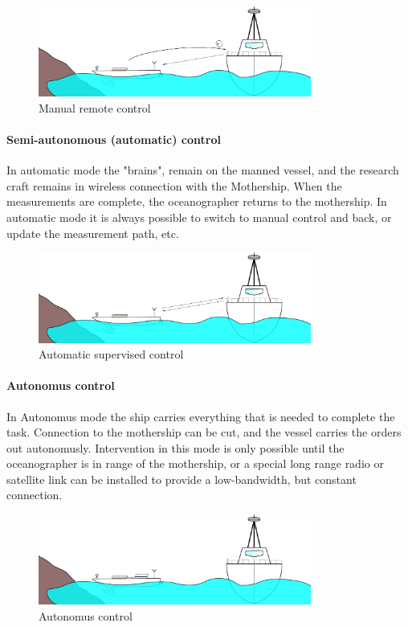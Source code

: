 \begin{figure}[H]
	\centering
	\includegraphics[width=0.8\textwidth]{img/manualcontrol}
	\caption{Manual remote control}
	\label{fig:manualcontrol}
\end{figure}

\paragraph{Semi-autonomous (automatic) control}
In automatic mode the "brains", remain on the manned vessel, and the research craft remains in wireless connection with the Mothership. When the measurements are complete, the oceanographer returns to the mothership. In automatic mode it is always possible to switch to manual control and back, or update the measurement path, etc.

\begin{figure}[H]
	\centering
	\includegraphics[width=0.8\textwidth]{img/automatic}
	\caption{Automatic supervised control}
	\label{fig:automatic}
\end{figure}

\paragraph{Autonomus control}
In Autonomus mode the ship carries everything that is needed to complete the task. Connection to the mothership can be cut, and the vessel carries the orders out autonomusly. Intervention in this mode is only possible until the oceanographer is in range of the mothership, or a special long range radio or satellite link can be installed to provide a low-bandwidth, but constant connection.

\begin{figure}[H]
	\centering
	\includegraphics[width=0.8\textwidth]{img/autonomus}
	\caption{Autonomus control}
	\label{fig:autonomus}
\end{figure}

